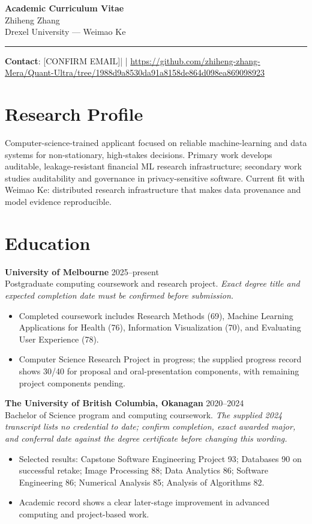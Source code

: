 \documentclass[11pt]{article}
\newcommand{\ApplicantName}{Zhiheng Zhang}
\newcommand{\ApplicantEmail}{[CONFIRM EMAIL]}
\newcommand{\ApplicantPhone}{[CONFIRM PHONE]}
\newcommand{\ApplicantGitHub}{\url{https://github.com/zhiheng-zhang-Mera/Quant-Ultra/tree/1988d9a8530da91a8158de864d098ea869098923}}
\begin{document}
\begin{center}
{\LARGE\bfseries Academic Curriculum Vitae}\\[0.25em]
{\large \ApplicantName}\\
Drexel University --- Weimao Ke
\end{center}
\vspace{0.35em}\hrule\vspace{0.65em}

\textbf{Contact}: \ApplicantEmail\quad | \quad \ApplicantPhone\quad | \quad \ApplicantGitHub

\section*{Research Profile}
Computer-science-trained applicant focused on reliable machine-learning and data systems for non-stationary, high-stakes decisions. Primary work develops auditable, leakage-resistant financial ML research infrastructure; secondary work studies auditability and governance in privacy-sensitive software. Current fit with Weimao Ke: distributed research infrastructure that makes data provenance and model evidence reproducible.

\section*{Education}
\textbf{University of Melbourne} \hfill 2025--present\\
Postgraduate computing coursework and research project. \textit{Exact degree title and expected completion date must be confirmed before submission.}
\begin{itemize}
\item Completed coursework includes Research Methods (69), Machine Learning Applications for Health (76), Information Visualization (70), and Evaluating User Experience (78).
\item Computer Science Research Project in progress; the supplied progress record shows 30/40 for proposal and oral-presentation components, with remaining project components pending.
\end{itemize}

\textbf{The University of British Columbia, Okanagan} \hfill 2020--2024\\
Bachelor of Science program and computing coursework. \textit{The supplied 2024 transcript lists no credential to date; confirm completion, exact awarded major, and conferral date against the degree certificate before changing this wording.}
\begin{itemize}
\item Selected results: Capstone Software Engineering Project 93; Databases 90 on successful retake; Image Processing 88; Data Analytics 86; Software Engineering 86; Numerical Analysis 85; Analysis of Algorithms 82.
\item Academic record shows a clear later-stage improvement in advanced computing and project-based work.
\end{itemize}
\end{document}
